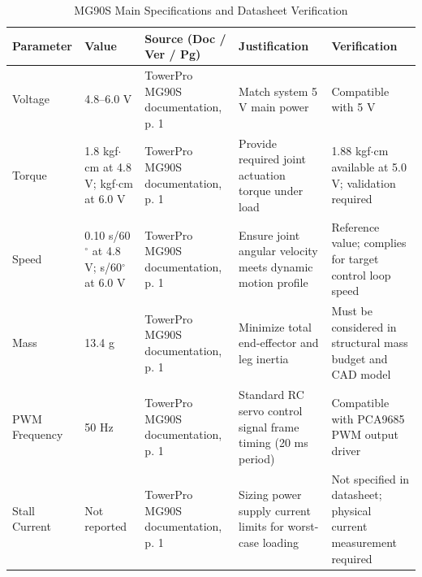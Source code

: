 \documentclass[lettersize,journal]{IEEEtran}
\begin{document}
	\begin{table}[!t]
		\centering
		\caption{MG90S Main Specifications and Datasheet Verification}
		\label{tab:mg90s_specs}
		\scriptsize
		
		\setlength{\tabcolsep}{2pt}
		\renewcommand{\arraystretch}{1.1}
		
		\begin{tabularx}{\columnwidth}{@{}P{1.5cm} P{1.7cm} P{2.0cm} X X@{}}
			\toprule
			\textbf{Parameter} & \textbf{Value} & \textbf{Source (Doc / Ver / Pg)} & \textbf{Justification} & \textbf{Verification} \\
			\midrule
			
			Voltage & 
			4.8--6.0 V & 
			TowerPro MG90S documentation, p. 1 & 
			Match system 5 V main power & 
			Compatible with 5 V \\
			
			Torque & 
			1.8 kgf$\cdot$cm at 4.8 V;  kgf$\cdot$cm at 6.0 V & 
			TowerPro MG90S documentation, p. 1 & 
			Provide required joint actuation torque under load & 
			1.88 kgf$\cdot$cm available at 5.0 V; validation required \\
			
			Speed & 
			0.10 s/60$^\circ$ at 4.8 V;  s/60$^\circ$ at 6.0 V & 
			TowerPro MG90S documentation, p. 1 & 
			Ensure joint angular velocity meets dynamic motion profile & 
			Reference value; complies for target control loop speed \\
			
			Mass & 
			13.4 g & 
			TowerPro MG90S documentation, p. 1 & 
			Minimize total end-effector and leg inertia & 
			Must be considered in structural mass budget and CAD model \\
			
			PWM Frequency & 
			50 Hz & 
			TowerPro MG90S documentation, p. 1 & 
			Standard RC servo control signal frame timing (20 ms period) & 
			Compatible with PCA9685 PWM output driver \\
			
			Stall Current & 
			Not reported & 
			TowerPro MG90S documentation, p. 1 & 
			Sizing power supply current limits for worst-case loading & 
			Not specified in datasheet; physical current measurement required \\
			
			\bottomrule
		\end{tabularx}
	\end{table}
	
\end{document}
